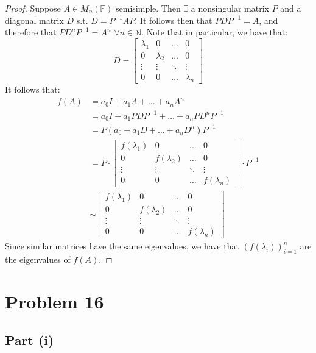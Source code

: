 \documentclass{article}
\begin{document}
\begin{proof}
Suppose $A \in M_{n}(\mathbb{F})$ semisimple. Then $\exists$ a nonsingular matrix $P$ and a diagonal matrix $D$ s.t. $D = P^{-1}AP$. It follows then that $PDP^{-1} = A$, and therefore that $PD^nP^{-1} = A^n$ $\forall n \in \mathbb{N}$. Note that in particular, we have that:
$$D = \begin{bmatrix} \lambda_1 & 0 & \dots & 0 \\
0 & \lambda_2 & \dots & 0 \\
\vdots & \vdots & \ddots & \vdots \\
0 & 0 & \dots & \lambda_n \end{bmatrix}$$
It follows that:
\begin{align*}
f(A) &= a_0 I + a_1 A + \dots + a_n A^n \\
&= a_0 I + a_1 PDP^{-1} + \dots + a_n PD^nP^{-1} \\
&= P(a_0 + a_1 D + \dots + a_n D^n)P^{-1} \\
&= P \cdot  \begin{bmatrix} f(\lambda_1) & 0 & \dots & 0 \\
0 & f(\lambda_2) & \dots & 0 \\
\vdots & \vdots & \ddots & \vdots \\
0 & 0 & \dots & f(\lambda_n)\end{bmatrix} \cdot P^{-1} \\
&\sim \begin{bmatrix} f(\lambda_1) & 0 & \dots & 0 \\
0 & f(\lambda_2) & \dots & 0 \\
\vdots & \vdots & \ddots & \vdots \\
0 & 0 & \dots & f(\lambda_n)\end{bmatrix}
\end{align*}
Since similar matrices have the same eigenvalues, we have that $(f(\lambda_i))_{i=1}^n$ are the eigenvalues of $f(A)$.
\end{proof}


\section*{Problem 16}

\subsection*{Part (i)}
\end{document}
